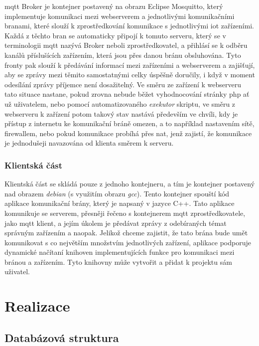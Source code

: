 \acrshort{mqtt} Broker je kontejner postavený na obrazu Eclipse Mosquitto, který implementuje komunikaci mezi webserverem a jednotlivými komunikačními branami, které slouží k zprostředkování komunikace s jednotlivými \acrshort{iot} zařízeními. Každá z těchto bran se automaticky připojí k tomuto serveru, který se v terminologii \acrshort{mqtt} nazývá Broker neboli zprostředkovatel, a přihlásí se k odběru kanálů příslušících zařízením, která jsou přes danou bránu obsluhována. Tyto fronty pak slouží k předávání informací mezi zařízeními a webserverem a zajišťují, aby se zprávy mezi těmito samostatnými celky úspěšně doručily, i když v moment odesílání zprávy příjemce není dosažitelný. Ve směru ze zařízení k webserveru tato situace nastane, pokud zrovna nebude běžet vyhodnocování stránky \acrshort{php} ať už uživatelem, nebo pomocí automatizovaného \emph{exekutor} skriptu, ve směru z webserveru k zařízení potom takový stav nastává především ve chvíli, kdy je přístup z internetu ke komunikační bráně omezen, a to například nastavením sítě, firewallem, nebo pokud komunikace probíhá přes \acrshort{nat}, jenž zajistí, že komunikace je jednodušeji navazována od klienta směrem k serveru.

\subsection{Klientská část}

Klientská část se skládá pouze z jednoho kontejneru, a tím je kontejner postavený nad obrazem \emph{debian} (s využitím obrazu \emph{gcc}). Tento kontejner spouští kód aplikace komunikační brány, který je napsaný v jazyce C++. Tato aplikace komunikuje se serverem, přesněji řečeno s kontejnerem \acrshort{mqtt} zprostředkovatele, jako \acrshort{mqtt} klient, a jejím úkolem je předávat zprávy z odebíraných témat správným zařízením a naopak. Jelikož chceme zajistit, že tato brána bude umět komunikovat s co největším množstvím jednotlivých zařízení, aplikace podporuje dynamické načítaní knihoven implementujících funkce pro komunikaci mezi bránou a zařízením. Tyto knihovny může vytvořit a přidat k projektu sám uživatel.

\chapter{Realizace}

\section{Databázová struktura}

